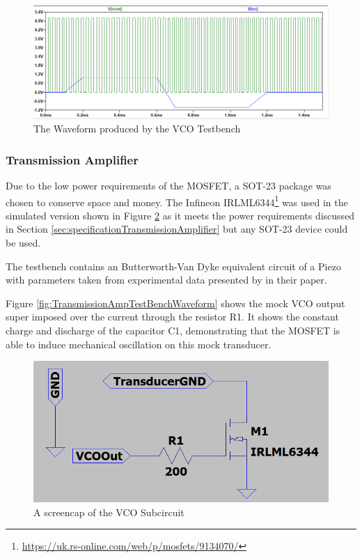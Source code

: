 \begin{figure}[H]
    \centering 
    \includegraphics[width=\textwidth]{../Circuits/Images/VCO/TestBenchWaveform}
    \caption{The Waveform produced by the VCO Testbench}
    \label{fig:VCOTestBenchWaveform}
\end{figure}

\subsubsection{Transmission Amplifier}
Due to the low power requirements of the MOSFET, a SOT-23 package was chosen to conserve space and money. 
The Infineon IRLML6344\footnote{\url{https://uk.rs-online.com/web/p/mosfets/9134070/}} was used in the simulated version shown in Figure \ref{fig:TransmissionAmpSchematic} as it meets the power requirements discussed in Section \ref{sec:specificationTransmissionAmplifier} but any SOT-23 device could be used.

The testbench contains an Butterworth-Van Dyke equivalent circuit of a Piezo with parameters taken from experimental data presented by \citeauthor{equivalentCircuit} in their \citeyear{equivalentCircuit} paper\cite{equivalentCircuit}.

Figure \ref{fig:TransmissionAmpTestBenchWaveform} shows the mock VCO output super imposed over the current through the resistor R1.
It shows the constant charge and discharge of the capacitor C1, demonstrating that the MOSFET is able to induce mechanical oscillation on this mock transducer.

\begin{figure}[H]
    \centering 
    \includegraphics[width=\textwidth]{../Circuits/Images/TransmissionAmp/Schematic}
    \caption{A screencap of the VCO Subcircuit}
    \label{fig:TransmissionAmpSchematic}
\end{figure}

